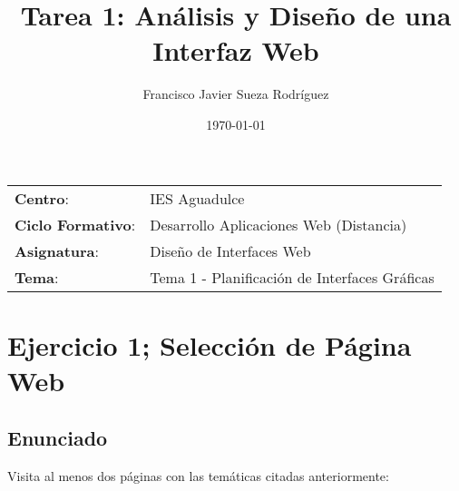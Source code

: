 


\title{
\vspace{10ex}
\normalfont \normalsize
\huge \textbf{Tarea 1: Análisis y Diseño de una Interfaz Web}
}
\author{Francisco Javier Sueza Rodríguez}
\date{\normalsize\today}



\maketitle

\thispagestyle{empty}

\vspace{75ex}

\begin{center}
    \begin{tabular}{l l}
        \textbf{Centro}: & IES Aguadulce \\
        \textbf{Ciclo Formativo}: & Desarrollo Aplicaciones Web (Distancia)\\
        \textbf{Asignatura}: & Diseño de Interfaces Web\\
        \textbf{Tema}: & Tema 1 -  Planificación de Interfaces Gráficas\\
    \end{tabular}
\end{center}

\newpage

\section{Ejercicio 1; Selección de Página Web}

\subsection{Enunciado}
Visita al menos dos páginas con las temáticas citadas anteriormente:


